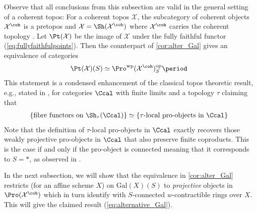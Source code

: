 \documentclass[leqno]{article}
\renewcommand{\Gal}{\mathrm{Gal}}
\begin{document}
\begin{remark}
Observe that all conclusions from this subsection are valid in the general setting of a coherent topos: For a coherent topos $\mathcal{X}$, the subcategory of coherent objects $\mathcal{X}^{\coh}$ is a pretopos \cite[Corollary C.5.14]{Ultracategories} and $\mathcal{X}=\Sh(\mathcal{X}^{\coh})$ where $\mathcal{X}^{\coh}$ carries the coherent topology \cite[Proposition C.6.4, Theorem C.6.5]{Ultracategories}. Let $\Pt(\mathcal{X})$ be the image of $\mathcal{X}$ under the fully faithful functor (\ref{eq:fullyfaithfulpoints}). Then the counterpart of \cref{cor:alter_Gal} gives an equivalence of categories
$$\Pt(\mathcal{X})(S)\simeq \Pro^{\mathrm{wp}}(\mathcal{X}^{\coh})_S^{\mathrm{op}}\period $$
This statement is a condensed enhancement of the classical topos theoretic result, e.g., stated in \cite[Proposition 1.4]{GABBER20154667}, for categories $\Ccal$ with finite limits and a topology $\tau$ claiming that
\begin{align}
    \{\text{fibre functors on } \Sh_{\tau}(\Ccal)\} \simeq \{\text{$\tau$-local pro-objects in $\Ccal$}\}
\end{align}
Note that the definition of $\tau$-local pro-objects in $\Ccal$ \cite[Definition 1.2]{GABBER20154667} exactly recovers those weakly projective pro-objects in $\Ccal$ that also preserve finite coproducts. This is the case if and only if the pro-object is connected meaning that it corresponds to $S=\ast$, as observed in \cite[Proposition 6.3.12 (3)]{Ultracategories}.
\end{remark}
In the next subsection, we will show that the equivalence in \cref{cor:alter_Gal} restricts (for an affine scheme $X$) on $\Gal(X)(S)$ to \textit{projective} objects in $\Pro(\mathcal{X}^{\coh})$ which in turn identify with $S$-connected $w$-contractible rings over $X$. This will give the claimed result (\ref{eq:alternative_Gal}).
%
\end{document}
